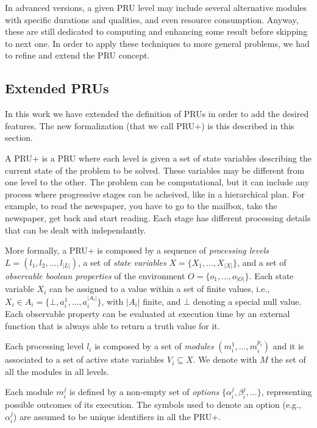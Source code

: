 In advanced versions, a given PRU level may include several alternative modules with specific durations and qualities, and even resource consumption. Anyway, these are still dedicated to computing and enhancing some result before skipping to next one. In order to apply these techniques to more general problems, we had to refine and extend the PRU concept.

\subsection{Extended PRUs}

In this work we have extended the definition of PRUs in order to add the desired features. The new formalization (that we call PRU+) is this described in this section.

A PRU+ is a PRU where each level is given a set of state variables describing the current state of the problem to be solved. These variables may be different from one level to the other. The problem can be computational, but it can include any process where progressive stages can be acheived, like in a hierarchical plan. For example, to read the newspaper, you have to go to the mailbox, take the newspaper, get back and start reading. Each stage has different processing details that can be dealt with independantly.

More formally, a PRU+ is composed by a sequence of \emph{processing levels} $L = ( l_1, l_2, \ldots, l_{|L|})$, a set of \emph{state variables} $X = \{ X_1, \ldots, X_{|X|} \}$, and a set of \emph{observable boolean properties} of the environment $O = \{ o_1, \ldots, o_{|O|} \}$.
Each state variable $X_i$ can be assigned to a value within a set of finite values, i.e., $X_i \in A_i = \{ \bot , a_i^1, \ldots, a_i^{|A_i|} \}$, with $|A_i|$ finite, and $\bot$ denoting a special null value. Each observable property can be evaluated at execution time by an external function that is always able to return a truth value for it.

Each processing level $l_i$ is composed by a set of \emph{modules} $( m_i^1, \ldots, m_i^{p_i} )$ and it is associated to a set of active state variables $V_i \subseteq X$.
We denote with $M$ the set of all the modules in all levels.

Each module $m_i^j$ is defined by a non-empty set of \emph{options} $\{ \alpha_i^j, \beta_i^j, \ldots \}$, representing possible outcomes of its execution. The symbols used to denote an option (e.g., $\alpha_i^j$) are assumed to be unique identifiers in all the PRU+.

